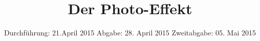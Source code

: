
\subject{Anfängerpraktikum V500}
\title{Der Photo-Effekt}
\date{
  Durchführung: 21.April 2015
  \hspace{3em}
  Abgabe: 28. April 2015
  Zweitabgabe: 05. Mai 2015
}


\maketitle
\thispagestyle{empty}
\newpage





\nocite{skript}
\newpage
\printbibliography
